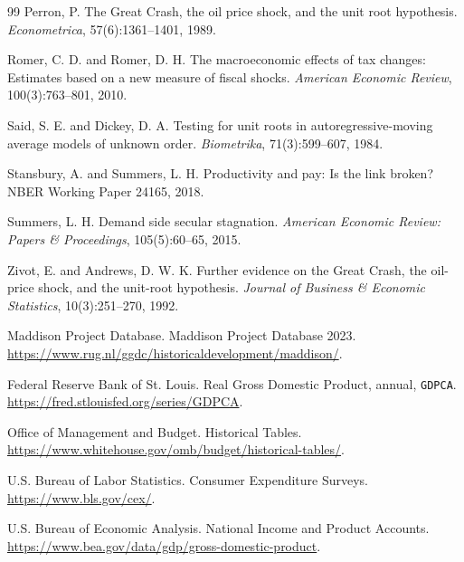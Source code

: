 \documentclass[11pt]{article}
\begin{document}
\begin{thebibliography}{99}
Perron, P.
\newblock The Great Crash, the oil price shock, and the unit root hypothesis.
\newblock \emph{Econometrica}, 57(6):1361--1401, 1989.

Romer, C. D. and Romer, D. H.
\newblock The macroeconomic effects of tax changes: Estimates based on a new
measure of fiscal shocks.
\newblock \emph{American Economic Review}, 100(3):763--801, 2010.

Said, S. E. and Dickey, D. A.
\newblock Testing for unit roots in autoregressive-moving average models of
unknown order.
\newblock \emph{Biometrika}, 71(3):599--607, 1984.

Stansbury, A. and Summers, L. H.
\newblock Productivity and pay: Is the link broken?
\newblock NBER Working Paper 24165, 2018.

Summers, L. H.
\newblock Demand side secular stagnation.
\newblock \emph{American Economic Review: Papers \& Proceedings},
105(5):60--65, 2015.

Zivot, E. and Andrews, D. W. K.
\newblock Further evidence on the Great Crash, the oil-price shock, and the
unit-root hypothesis.
\newblock \emph{Journal of Business \& Economic Statistics}, 10(3):251--270, 1992.

Maddison Project Database.
\newblock Maddison Project Database 2023.
\newblock \url{https://www.rug.nl/ggdc/historicaldevelopment/maddison/}.

Federal Reserve Bank of St. Louis.
\newblock Real Gross Domestic Product, annual, \texttt{GDPCA}.
\newblock \url{https://fred.stlouisfed.org/series/GDPCA}.

Office of Management and Budget.
\newblock Historical Tables.
\newblock \url{https://www.whitehouse.gov/omb/budget/historical-tables/}.

U.S. Bureau of Labor Statistics.
\newblock Consumer Expenditure Surveys.
\newblock \url{https://www.bls.gov/cex/}.

U.S. Bureau of Economic Analysis.
\newblock National Income and Product Accounts.
\newblock \url{https://www.bea.gov/data/gdp/gross-domestic-product}.

\end{thebibliography}
\end{document}

